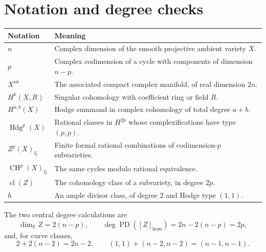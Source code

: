 \documentclass[11pt,reqno]{amsart}
\theoremstyle{definition}
\theoremstyle{remark}
\numberwithin{equation}{section}
\newcommand{\R}{\mathbb{R}}
\newcommand{\Q}{\mathbb{Q}}
\newcommand{\an}{\mathrm{an}}
\DeclareMathOperator{\CH}{CH}
\DeclareMathOperator{\Hdg}{Hdg}
\DeclareMathOperator{\cl}{cl}
\DeclareMathOperator{\PD}{PD}
\begin{document}
\appendix
\section{Notation and degree checks}

\begin{center}\small
\begin{tabularx}{\textwidth}{@{}lX@{}}\toprule
Notation & Meaning \\ \midrule
$n$ & Complex dimension of the smooth projective ambient variety $X$.\\
$p$ & Complex codimension of a cycle with components of dimension $n-p$.\\
$X^{\an}$ & The associated compact complex manifold, of real dimension $2n$.\\
$H^k(X,R)$ & Singular cohomology with coefficient ring or field $R$.\\
$H^{a,b}(X)$ & Hodge summand in complex cohomology of total degree $a+b$.\\
$\Hdg^p(X)$ & Rational classes in $H^{2p}$ whose complexifications have type $(p,p)$.\\
$Z^p(X)_{\Q}$ & Finite formal rational combinations of codimension-$p$ subvarieties.\\
$\CH^p(X)_{\Q}$ & The same cycles modulo rational equivalence.\\
$\cl(Z)$ & The cohomology class of a subvariety, in degree $2p$.\\
$h$ & An ample divisor class, of degree $2$ and Hodge type $(1,1)$.\\
\bottomrule
\end{tabularx}
\end{center}

The two central degree calculations are
\[
 \dim_{\R}Z=2(n-p),\qquad
 \deg\PD([Z]_{\mathrm{hom}})=2n-2(n-p)=2p,
\]
and, for curve classes,
\[
 2+2(n-2)=2n-2,\qquad
 (1,1)+(n-2,n-2)=(n-1,n-1).
\]





\end{document}
